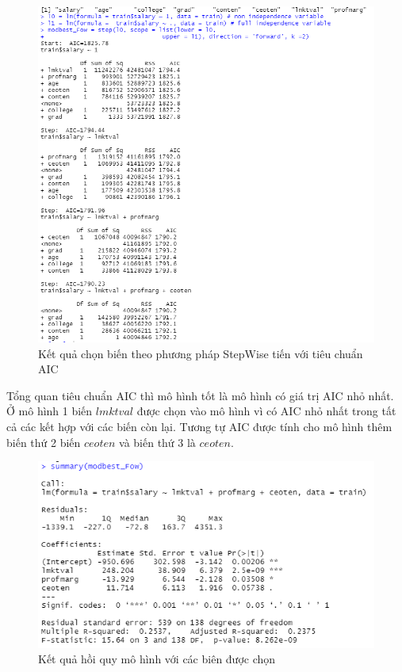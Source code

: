 \begin{figure}[h!]
	\centering
	\includegraphics[scale = 0.52]{../Photo Of Result/B1_stepwiseForward.PNG}  
	\caption{Kết quả chọn biến theo phương pháp StepWise tiến với tiêu chuẩn AIC}
	\label{fig-b1:stepwise-forward}
\end{figure}

Tổng quan tiêu chuẩn AIC thì mô hình tốt là mô hình có giá trị AIC nhỏ nhất. Ở mô hình 1 biến $\textit{lmktval}$ được chọn vào mô hình vì có AIC nhỏ nhất trong tất cả các kết hợp với các biến còn lại. Tương tự AIC được tính cho mô hình thêm biến thứ 2 biến $\textit{ceoten}$ và biến thứ 3 là $\textit{ceoten}$. 

\begin{figure}[h!]
	\centering
	\includegraphics[scale = 0.52]{../Photo Of Result/B1_summary.PNG}  
	\caption{Kết quả hồi quy mô hình với các biên được chọn}
	\label{ex1:model:1}
\end{figure}


